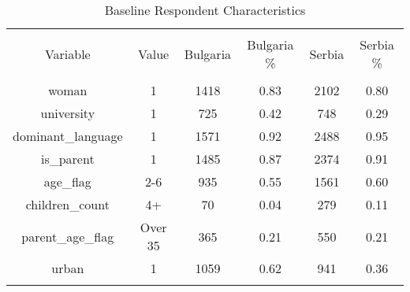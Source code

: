 
\begin{table}[!htbp] \centering 
  \caption{Baseline Respondent Characteristics} 
  \label{tbl:Baseline Respondent Characteristics} 
\begin{tabular}{@{\extracolsep{5pt}} cccccc} 
\\[-1.8ex]\hline 
\hline \\[-1.8ex] 
Variable & Value & Bulgaria & Bulgaria \% & Serbia & Serbia \% \\ 
\hline \\[-1.8ex] 
woman & 1 & 1418 & 0.83 & 2102 & 0.80 \\ 
university & 1 &  725 & 0.42 &  748 & 0.29 \\ 
dominant\_language & 1 & 1571 & 0.92 & 2488 & 0.95 \\ 
is\_parent & 1 & 1485 & 0.87 & 2374 & 0.91 \\ 
age\_flag & 2-6 &  935 & 0.55 & 1561 & 0.60 \\ 
children\_count & 4+ &   70 & 0.04 &  279 & 0.11 \\ 
parent\_age\_flag & Over 35 &  365 & 0.21 &  550 & 0.21 \\ 
urban & 1 & 1059 & 0.62 &  941 & 0.36 \\ 
\hline \\[-1.8ex] 
\end{tabular} 
\end{table} 
